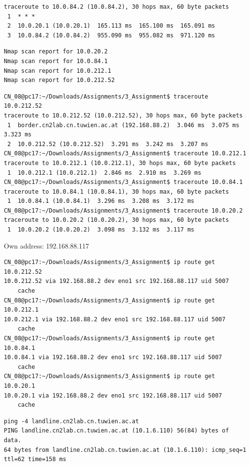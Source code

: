 \documentclass[parskip=full]{scrartcl}
\begin{document}
\begin{verbatim}
traceroute to 10.0.84.2 (10.0.84.2), 30 hops max, 60 byte packets
 1  * * *
 2  10.0.20.1 (10.0.20.1)  165.113 ms  165.100 ms  165.091 ms
 3  10.0.84.2 (10.0.84.2)  955.090 ms  955.082 ms  971.120 ms
\end{verbatim}

\begin{verbatim}
Nmap scan report for 10.0.20.2
Nmap scan report for 10.0.84.1
Nmap scan report for 10.0.212.1
Nmap scan report for 10.0.212.52
\end{verbatim}

\begin{verbatim}
CN_08@pc17:~/Downloads/Assignments/3_Assignment$ traceroute 10.0.212.52
traceroute to 10.0.212.52 (10.0.212.52), 30 hops max, 60 byte packets
 1  border.cn2lab.cn.tuwien.ac.at (192.168.88.2)  3.046 ms  3.075 ms  3.323 ms
 2  10.0.212.52 (10.0.212.52)  3.291 ms  3.242 ms  3.207 ms
CN_08@pc17:~/Downloads/Assignments/3_Assignment$ traceroute 10.0.212.1
traceroute to 10.0.212.1 (10.0.212.1), 30 hops max, 60 byte packets
 1  10.0.212.1 (10.0.212.1)  2.846 ms  2.910 ms  3.269 ms
CN_08@pc17:~/Downloads/Assignments/3_Assignment$ traceroute 10.0.84.1
traceroute to 10.0.84.1 (10.0.84.1), 30 hops max, 60 byte packets
 1  10.0.84.1 (10.0.84.1)  3.296 ms  3.208 ms  3.172 ms
CN_08@pc17:~/Downloads/Assignments/3_Assignment$ traceroute 10.0.20.2
traceroute to 10.0.20.2 (10.0.20.2), 30 hops max, 60 byte packets
 1  10.0.20.2 (10.0.20.2)  3.098 ms  3.132 ms  3.117 ms
\end{verbatim}

Own address: 192.168.88.117

\begin{verbatim}
CN_08@pc17:~/Downloads/Assignments/3_Assignment$ ip route get 10.0.212.52
10.0.212.52 via 192.168.88.2 dev eno1 src 192.168.88.117 uid 5007
    cache
CN_08@pc17:~/Downloads/Assignments/3_Assignment$ ip route get 10.0.212.1
10.0.212.1 via 192.168.88.2 dev eno1 src 192.168.88.117 uid 5007
    cache
CN_08@pc17:~/Downloads/Assignments/3_Assignment$ ip route get 10.0.84.1
10.0.84.1 via 192.168.88.2 dev eno1 src 192.168.88.117 uid 5007
    cache
CN_08@pc17:~/Downloads/Assignments/3_Assignment$ ip route get 10.0.20.1
10.0.20.1 via 192.168.88.2 dev eno1 src 192.168.88.117 uid 5007
    cache
\end{verbatim}

\begin{verbatim}
ping -4 landline.cn2lab.cn.tuwien.ac.at
PING landline.cn2lab.cn.tuwien.ac.at (10.1.6.110) 56(84) bytes of data.
64 bytes from landline.cn2lab.cn.tuwien.ac.at (10.1.6.110): icmp_seq=1 ttl=62 time=158 ms
\end{verbatim}
\end{document}
